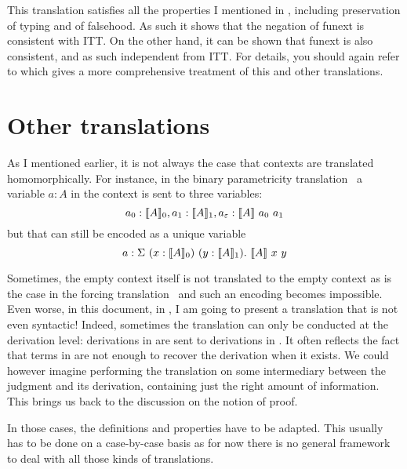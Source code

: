 This translation satisfies all the properties I mentioned in
, including preservation of typing and of falsehood.
As such it shows that the negation of \acrshort{funext} is consistent with
\acrshort{ITT}. On the other hand, it can be shown that \acrshort{funext} is
also consistent, and as such independent from \acrshort{ITT}.
For details, you should again refer to
which gives a more comprehensive treatment of this and other translations.

\section{Other translations}

As I mentioned earlier, it is not always the case that contexts are translated
homomorphically. For instance, in the binary parametricity
translation~ a variable
\(a : A\) in the context is sent to three variables:
\[
  a_0 : \llbracket A \rrbracket_0, a_1 : \llbracket A \rrbracket_1, a_\varepsilon : \llbracket A \rrbracket\ a_0\ a_1
\]
but that can still be encoded as a unique variable
\[
  a : \Sigma\ (x : \llbracket A \rrbracket_0)\ (y : \llbracket A \rrbracket_1).\ \llbracket A \rrbracket\ x\ y
\]

Sometimes, the empty context itself is not translated to the empty context
as is the case in the forcing translation~ and
such an encoding becomes impossible.
Even worse, in this document, in , I am going to
present a translation that is not even syntactic! Indeed, sometimes the
translation can only be conducted at the derivation level: derivations in \cS
are sent to derivations in \cT. It often reflects the fact that terms in \cS are
not enough to recover the derivation when it exists.
We could however imagine performing the translation on some intermediary between
the judgment and its derivation, containing just the right amount of
information. This brings us back to the discussion on the notion of
proof.

In those cases, the definitions and properties have to be adapted. This usually
has to be done on a case-by-case basis as for now there is no general framework
to deal with all those kinds of translations.

